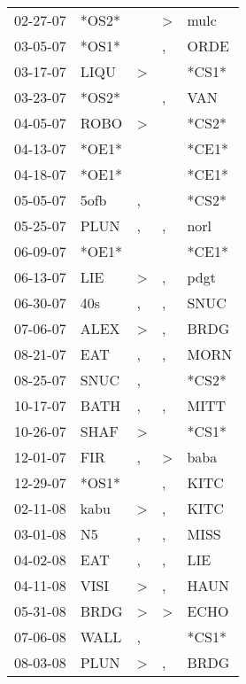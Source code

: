 \begin{supertabular}{lllll}
 02-27-07 &  *OS2* &               &  \textgreater &   mulc \\
 03-05-07 &  *OS1* &               &             , &   ORDE \\
 03-17-07 &   LIQU &  \textgreater &               &  *CS1* \\
 03-23-07 &  *OS2* &               &             , &    VAN \\
 04-05-07 &   ROBO &  \textgreater &               &  *CS2* \\
 04-13-07 &  *OE1* &               &               &  *CE1* \\
 04-18-07 &  *OE1* &               &               &  *CE1* \\
 05-05-07 &   5ofb &             , &               &  *CS2* \\
 05-25-07 &   PLUN &             , &             , &   norl \\
 06-09-07 &  *OE1* &               &               &  *CE1* \\
 06-13-07 &    LIE &  \textgreater &             , &   pdgt \\
 06-30-07 &    40s &             , &             , &   SNUC \\
 07-06-07 &   ALEX &  \textgreater &             , &   BRDG \\
 08-21-07 &    EAT &             , &             , &   MORN \\
 08-25-07 &   SNUC &             , &               &  *CS2* \\
 10-17-07 &   BATH &             , &             , &   MITT \\
 10-26-07 &   SHAF &  \textgreater &               &  *CS1* \\
 12-01-07 &    FIR &             , &  \textgreater &   baba \\
 12-29-07 &  *OS1* &               &             , &   KITC \\
 02-11-08 &   kabu &  \textgreater &             , &   KITC \\
 03-01-08 &     N5 &             , &             , &   MISS \\
 04-02-08 &    EAT &             , &             , &    LIE \\
 04-11-08 &   VISI &  \textgreater &             , &   HAUN \\
 05-31-08 &   BRDG &  \textgreater &  \textgreater &   ECHO \\
 07-06-08 &   WALL &             , &               &  *CS1* \\
 08-03-08 &   PLUN &  \textgreater &             , &   BRDG \\

\end{supertabular}
